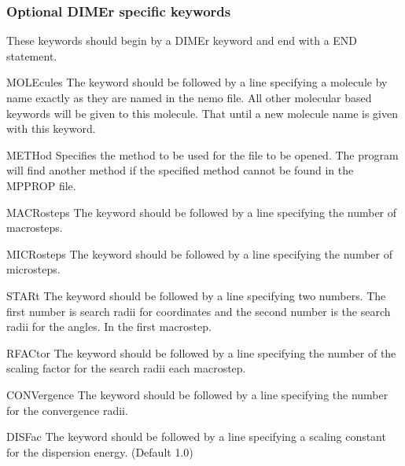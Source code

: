 \subsubsection{Optional DIMEr specific keywords}
These keywords should begin by a DIMEr keyword and end with a END statement.
\begin{keywordlist}
\item[MOLEcules]
The keyword should be followed by a line specifying a molecule by name exactly as they are named in the nemo file. All other molecular based keywords will be given to this molecule. That until a new molecule name is given with this keyword.
\item[METHod]
Specifies the method to be used for the file to be opened. The program will find another method if the specified method cannot be found in the MPPROP file.
\item[MACRosteps]
The keyword should be followed by a line specifying the number of macrosteps.
\item[MICRosteps]
The keyword should be followed by a line specifying the number of microsteps.
\item[STARt]
The keyword should be followed by a line specifying two numbers. The first number is search radii for coordinates and
the second number is the search radii for the angles. In the first macrostep.
\item[RFACtor]
The keyword should be followed by a line specifying the number of the scaling factor for the search radii each macrostep.
\item[CONVergence]
The keyword should be followed by a line specifying the number for the convergence radii.
\item[DISFac]
The keyword should be followed by a line specifying a scaling constant for the dispersion energy. (Default 1.0)
\end{keywordlist}

